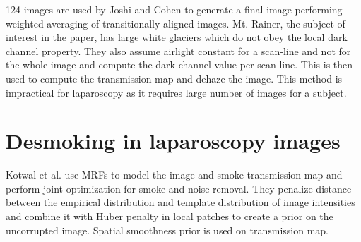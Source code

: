 124 images are used by Joshi and Cohen \cite{joshi2010multi} to generate a final image performing weighted averaging of transitionally aligned images. Mt. Rainer, the subject of interest in the paper, has large white glaciers which do not obey the local dark channel property. They also assume airlight constant for a scan-line and not for the whole image and compute the dark channel value per scan-line. This is then used to compute the transmission map and dehaze the image. This method is impractical for laparoscopy as it requires large number of images for a subject. 




\section{Desmoking in laparoscopy images}
Kotwal et al. \cite{kotwal2016joint} use MRFs to model the image and smoke transmission map and perform joint optimization for smoke and noise removal. They penalize distance between the empirical distribution and template distribution of image intensities and combine it with Huber penalty in local patches to create a prior on the uncorrupted image. Spatial smoothness prior is used on transmission map.












